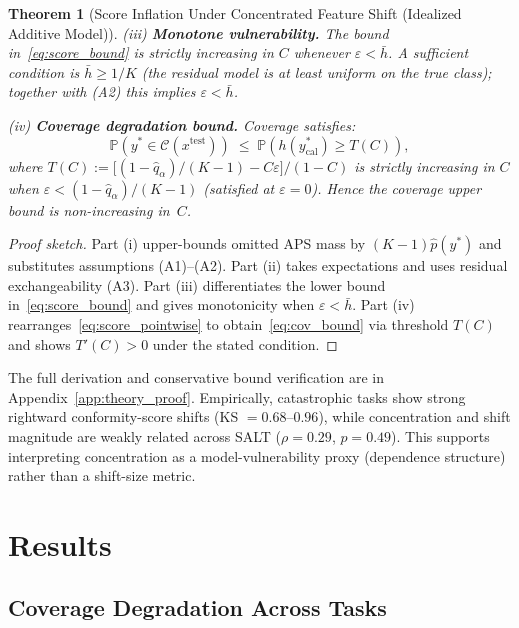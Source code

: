 \documentclass{uai2026} %
\newtheorem{theorem}{Theorem}
\begin{document}
\begin{theorem}[Score Inflation Under Concentrated Feature Shift (Idealized Additive Model)]
\smallskip
\noindent\textup{(iii)} \textbf{Monotone vulnerability.} The bound in~\eqref{eq:score_bound} is strictly increasing in $C$ whenever $\varepsilon < \bar{h}$. A sufficient condition is $\bar{h} \geq 1/K$ (the residual model is at least uniform on the true class); together with \textup{(A2)} this implies $\varepsilon < \bar{h}$.

\smallskip
\noindent\textup{(iv)} \textbf{Coverage degradation bound.} Coverage satisfies:
\begin{equation}\label{eq:cov_bound}
\mathbb{P}(y^* \!\in\! \mathcal{C}(x^{\mathrm{test}})) \;\leq\; \mathbb{P}\!\left(h(y^*_{\mathrm{cal}}) \geq T(C)\right),
\end{equation}
where $T(C) := \bigl[(1\!-\!\hat{q}_\alpha)/(K\!-\!1) - C\varepsilon\bigr]/(1\!-\!C)$ is strictly increasing in $C$ when $\varepsilon < (1\!-\!\hat{q}_\alpha)/(K\!-\!1)$ (satisfied at $\varepsilon = 0$). Hence the coverage upper bound is non-increasing in~$C$.
\end{theorem}

\begin{proof}[Proof sketch]
Part (i) upper-bounds omitted APS mass by $(K-1)\hat{p}(y^*)$ and substitutes assumptions (A1)--(A2). Part (ii) takes expectations and uses residual exchangeability (A3). Part (iii) differentiates the lower bound in~\eqref{eq:score_bound} and gives monotonicity when $\varepsilon < \bar{h}$. Part (iv) rearranges~\eqref{eq:score_pointwise} to obtain~\eqref{eq:cov_bound} via threshold $T(C)$ and shows $T'(C)>0$ under the stated condition.
\end{proof}

The full derivation and conservative bound verification are in Appendix~\ref{app:theory_proof}. Empirically, catastrophic tasks show strong rightward conformity-score shifts (KS $= 0.68$--$0.96$), while concentration and shift magnitude are weakly related across SALT ($\rho = 0.29$, $p = 0.49$). This supports interpreting concentration as a model-vulnerability proxy (dependence structure) rather than a shift-size metric.

\section{Results}\label{sec:results}

\subsection{Coverage Degradation Across Tasks}
\end{document}
